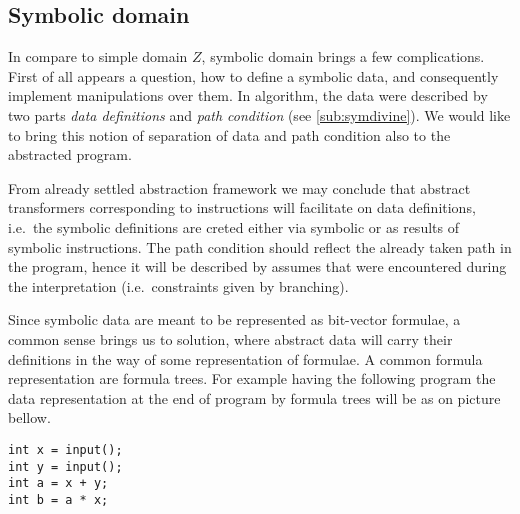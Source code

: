 \subsection{Symbolic domain}\label{sec:sym}

In compare to simple domain $Z$, symbolic domain brings a few complications.
First of all appears a question, how to define a symbolic data, and consequently
implement manipulations over them. In \SymDIVINE algorithm, the data were
described by two parts \emph{data definitions} and \emph{path condition} (see
\autoref{sub:symdivine}). We would like to bring this notion of separation of data
and path condition also to the abstracted program.

From already settled abstraction framework we may conclude that abstract
transformers corresponding to \LLVM instructions will facilitate on data
definitions, i.e.~the symbolic definitions are creted either via symbolic
 or as results of symbolic instructions. The path condition should
reflect the already taken path in the program, hence it will be described by
assumes that were encountered during the interpretation (i.e.~constraints given
by branching).

Since symbolic data are meant to be represented as bit-vector formulae,
a common sense brings us to solution, where abstract data will carry their
definitions in the way of some representation of formulae. A common formula
representation are formula trees. For example having the following program the
data representation at the end of program by formula trees will be as on picture bellow.
\begin{verbatim}
int x = input();
int y = input();
int a = x + y;
int b = a * x;
\end{verbatim}

\begin{center}
\begin{minipage}{.4\textwidth}
\end{minipage}
\begin{minipage}{.4\textwidth}
\end{minipage}
\end{center}

